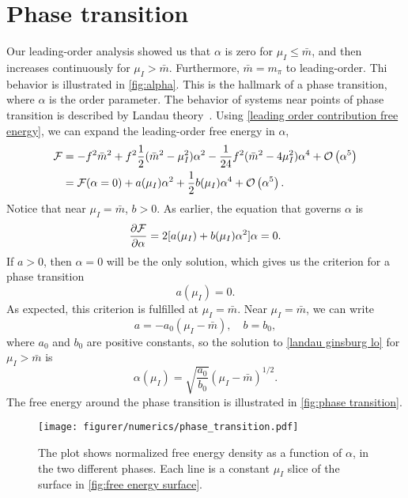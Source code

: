 \section{Phase transition}

Our leading-order analysis showed us that $\alpha$ is zero for $\mu_I \leq \bar m$, and then increases continuously for $\mu_I>\bar m$.
Furthermore, $\bar m = m_\pi$ to leading-order.
Thi behavior is illustrated in \autoref{fig:alpha}.
This is the hallmark of a phase transition, where $\alpha$ is the order parameter.
The behavior of systems near points of phase transition is described by Landau theory~\cite{Peskin:IntroQFT}.
Using \cref{leading order contribution free energy}, we can expand the leading-order free energy in $\alpha$,
\begin{align}
    \nonumber
    \Ef
    & = -f^2 \bar m^2 + f^2 \frac{1}{2}(\bar m^2 - \mu_I^2)\alpha^2
    - \frac{1}{24} f^2 (\bar m^2 - 4 \mu_I^2) \alpha^4 + \Oh[5]{\alpha} \\
    & = \Ef(\alpha=0) + a(\mu_I)\alpha^2 + \frac{1}{2} b(\mu_I)\alpha^4 + \Oh[5]{\alpha}.
\end{align}
Notice that near $\mu_I = \bar m$, $b > 0$.
As earlier, the equation that governs $\alpha$ is
\begin{equation}
    \label{landau ginsburg lo}
    \diffp{\Ef}{\alpha} = 2 [a(\mu_I) + b(\mu_I) \alpha^2] \alpha = 0.
\end{equation}
If $a>0$, then $\alpha = 0$ will be the only solution, which gives us the criterion for a phase transition 
\begin{equation}
    a(\mu_I) = 0.
\end{equation}
As expected, this criterion is fulfilled at $\mu_I = \bar m$.
Near $\mu_I = \bar m$, we can write
\begin{equation}
    a = - a_0 (\mu_I - \bar m), \quad b = b_0,
\end{equation}
where $a_0$ and $b_0$ are positive constants, so the solution to \cref{landau ginsburg lo} for $\mu_I>\bar m$ is
\begin{equation}
    \alpha(\mu_I) = \sqrt{\frac{a_0}{b_0}} (\mu_I - \bar m)^{1/2}.
\end{equation}
The free energy around the phase transition is illustrated in \autoref{fig:phase transition}.
\begin{figure}[h]
    \centering
    \texttt{[image: figurer/numerics/phase\_transition.pdf]}
    \caption{The plot shows normalized free energy density as a function of $\alpha$, in the two different phases. Each line is a constant $\mu_I$ slice of the surface in \autoref{fig:free energy surface}.}
    \label{fig:phase transition}
\end{figure}

